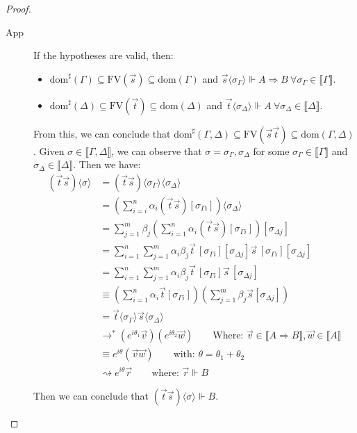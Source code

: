 \documentclass[a4paper,UKenglish,numberwithinsect,pdfa,anonymous]{lipics-v2021}
\theoremstyle{restatestyle}
\newcommand\lra{\longrightarrow}
\newcommand\ansubst[2]{\ensuremath{\langle #1 \rangle_{#2}}}
\newcommand\dom[1]{\mathrm{dom}(#1)}
\newcommand\sdom[1]{\mathrm{dom}^{\sharp}(#1)}
\newcommand\FV[1]{\mathrm{FV}(#1)}
\def\lraneq{\rightsquigarrow}
\def\eval{\lra^*}
\def\Arr{\Rightarrow}
\def\sem#1{\llbracket#1\rrbracket}
\def\real{\Vdash}
\begin{document}
\begin{proof}
\begin{description}
    \item[App] If the hypotheses are valid, then:
    \begin{itemize}
        \item $\sdom{\Gamma}\subseteq \FV{\vec s}\subseteq \dom{\Gamma}$ and $\vec s \ansubst{\sigma_\Gamma}{}\Vdash A\Arr B\ \forall \sigma_\Gamma\in\sem{\Gamma}$.
        \item $\sdom{\Delta}\subseteq \FV{\vec t}\subseteq \dom{\Delta}$ and $\vec t\ansubst{\sigma_\Delta}{}\Vdash A\ \forall\sigma_\Delta\in\sem{\Delta}$.
    \end{itemize}
    
    From this, we can conclude that $\sdom{\Gamma,\Delta}\subseteq \FV{\vec s \vec t}\subseteq \dom{\Gamma,\Delta}$. Given $\sigma\in\sem{\Gamma,\Delta}$, we can observe that $\sigma=\sigma_\Gamma,\sigma_\Delta$ for some $\sigma_\Gamma\in\sem{\Gamma}$ and $\sigma_\Delta\in\sem{\Delta}$. Then we have:
    \begin{align*}
        (\vec{t}\vec{s})\ansubst{\sigma}{} &= (\vec{t}\vec{s})\ansubst{\sigma_\Gamma}{}\ansubst{\sigma_\Delta}{}\\
        &=(\sum_{i=i}^{n}\alpha_i (\vec{t}\vec{s})[\sigma_{\Gamma i}])\ansubst{\sigma_\Delta}{}\\
        &=\sum_{j=1}^{m} \beta_j (\sum_{i=1}^{n} \alpha_i (\vec{t} \vec{s})[\sigma_{\Gamma i}])[\sigma_{\Delta j}]\\
        &=\sum_{i=1}^{n}\sum_{j=1}^{m} \alpha_i \beta_j \vec{t}\,[\sigma_{\Gamma i}][\sigma_{\Delta j}] \vec{s}\,[\sigma_{\Gamma i}][\sigma_{\Delta j}]\\
        &=\sum_{i=1}^{n}\sum_{j=1}^{m} \alpha_i \beta_j \vec{t}\,[\sigma_{\Gamma i}]\vec{s}\,[\sigma_{\Delta j}]\\
        &\equiv (\sum_{i=1}^{n}\alpha_i\vec{t}[\sigma_{\Gamma i}])(\sum_{j=1}^{m} \beta_j \vec{s}[\sigma_{\Delta j}])\\
        &=\vec{t}\ansubst{\sigma_\Gamma}{} \vec{s}\ansubst{\sigma_\Delta}{}\\
        &\eval (e^{i\theta_{1}} \vec{v}) (e^{i\theta_{2}} \vec{w})\qquad\text{Where: } \vec{v}\in\sem{A\Arr B}, \vec{w}\in\sem{A}\\
        &\equiv e^{i\theta} (\vec{v} \vec{w})\qquad\text{with: }\theta=\theta_1 + \theta_2\\
        &\lraneq e^{i\theta}\vec r\qquad\text{where: } \vec{r}\real B
    \end{align*}
    
    Then we can conclude that $(\vec{t}\vec{s})\ansubst{\sigma}{}\real B$.


\end{description}
\end{proof}
\end{document}
